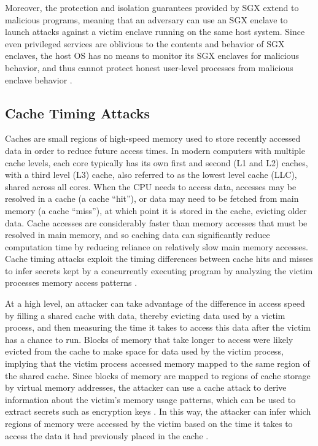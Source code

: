 Moreover, the protection and isolation guarantees provided by SGX extend to malicious programs, meaning that an adversary can use an SGX enclave to launch attacks against a victim enclave running on the same host system. Since even privileged services are oblivious to the contents and behavior of SGX enclaves, the host OS has no means to monitor its SGX enclaves for malicious behavior, and thus cannot protect honest user-level processes from malicious enclave behavior \cite{costan_intel_2016, schwarz_malware_2017}.

\subsection{Cache Timing Attacks}

Caches are small regions of high-speed memory used to store recently accessed data in order to reduce future access times. In modern computers with multiple cache levels, each core typically has its own first and second (L1 and L2) caches, with a third level (L3) cache, also referred to as the lowest level cache (LLC), shared across all cores. When the CPU needs to access data, accesses may be resolved in a cache (a cache ``hit''), or data may need to be fetched from main memory (a cache ``miss''), at which point it is stored in the cache, evicting older data. Cache accesses are considerably faster than memory accesses that must be resolved in main memory, and so caching data can significantly reduce computation time by reducing reliance on relatively slow main memory accesses. Cache timing attacks exploit the timing differences between cache hits and misses to infer secrets kept by a concurrently executing program by analyzing the victim processes memory access patterns \cite{costan_intel_2016, moghimi_cachezoom:_2017}.  

At a high level, an attacker can take advantage of the difference in access speed by filling a shared cache with data, thereby evicting data used by a victim process, and then measuring the time it takes to access this data after the victim has a chance to run. Blocks of memory that take longer to access were likely evicted from the cache to make space for data used by the victim process, implying that the victim process accessed memory mapped to the same region of the shared cache. Since blocks of memory are mapped to regions of cache storage by virtual memory addresses, the attacker can use a cache attack to derive information about the victim's memory usage patterns, which can be used to extract secrets such as encryption keys \cite{liu_cache-timing_2013}. In this way, the attacker can infer which regions of memory were accessed by the victim based on the time it takes to access the data it had previously placed in the cache \cite{moghimi_cachezoom:_2017, gotzfried_cache_2017}.

